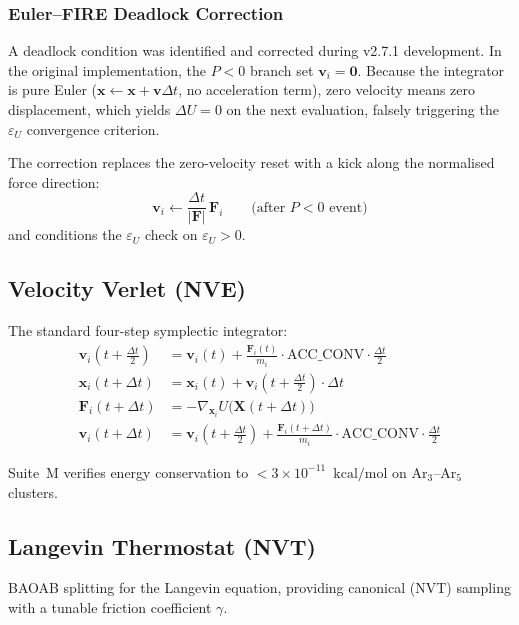 \documentclass[11pt,twoside]{article}
\newcommand{\kcalmol}{\text{kcal/mol}}
\begin{document}
\subsubsection{Euler--FIRE Deadlock Correction}

A deadlock condition was identified and corrected during v2.7.1 development.
In the original implementation, the $P < 0$ branch set
$\mathbf{v}_i = \mathbf{0}$.  Because the integrator is pure Euler
($\mathbf{x} \leftarrow \mathbf{x} + \mathbf{v}\Delta t$, no acceleration
term), zero velocity means zero displacement, which yields
$\Delta U = 0$ on the next evaluation, falsely triggering the
$\varepsilon_U$ convergence criterion.

The correction replaces the zero-velocity reset with a kick along the
normalised force direction:
\begin{equation}
  \mathbf{v}_i \leftarrow \frac{\Delta t}{|\mathbf{F}|} \, \mathbf{F}_i
  \qquad \text{(after $P < 0$ event)}
\end{equation}
and conditions the $\varepsilon_U$ check on $\varepsilon_U > 0$.

\subsection{Velocity Verlet (NVE)}

The standard four-step symplectic integrator:
\begin{align}
  \mathbf{v}_i(t + \tfrac{\Delta t}{2}) &= \mathbf{v}_i(t) +
    \frac{\mathbf{F}_i(t)}{m_i} \cdot \text{ACC\_CONV} \cdot \frac{\Delta t}{2} \\
  \mathbf{x}_i(t + \Delta t) &= \mathbf{x}_i(t) +
    \mathbf{v}_i(t + \tfrac{\Delta t}{2}) \cdot \Delta t \\
  \mathbf{F}_i(t + \Delta t) &= -\nabla_{\mathbf{x}_i} U\bigl(\mathbf{X}(t+\Delta t)\bigr) \\
  \mathbf{v}_i(t + \Delta t) &= \mathbf{v}_i(t + \tfrac{\Delta t}{2}) +
    \frac{\mathbf{F}_i(t+\Delta t)}{m_i} \cdot \text{ACC\_CONV} \cdot \frac{\Delta t}{2}
\end{align}

Suite~M verifies energy conservation to $< 3 \times 10^{-11}$~$\kcalmol$ on
Ar$_3$--Ar$_5$ clusters.

\subsection{Langevin Thermostat (NVT)}

BAOAB splitting for the Langevin equation, providing canonical (NVT)
sampling with a tunable friction coefficient $\gamma$.
\end{document}
